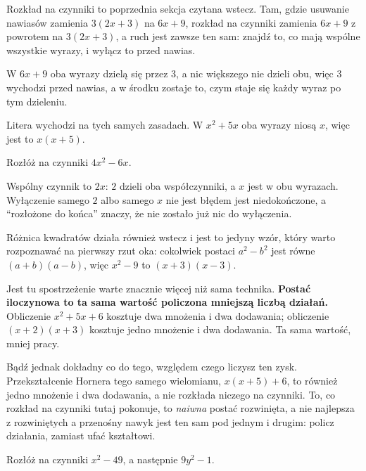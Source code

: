 \begin{fr}
Rozkład na czynniki to poprzednia sekcja czytana wstecz. Tam, gdzie usuwanie
nawiasów zamienia $3(2x + 3)$ na $6x + 9$, rozkład na czynniki zamienia
$6x + 9$ z powrotem na $3(2x + 3)$, a ruch jest zawsze ten sam: znajdź to, co
mają wspólne wszystkie wyrazy, i wyłącz to przed nawias.

W $6x + 9$ oba wyrazy dzielą się przez $3$, a nic większego nie dzieli obu,
więc $3$ wychodzi przed nawias, a w środku zostaje to, czym staje się każdy
wyraz po tym dzieleniu.

Litera wychodzi na tych samych zasadach. W $x^{2} + 5x$ oba wyrazy niosą $x$,
więc jest to $x(x + 5)$.

Rozłóż na czynniki $4x^{2} - 6x$.
\nextframe
\end{fr}

\begin{fr}
Wspólny czynnik to $2x$: $2$ dzieli oba współczynniki, a $x$ jest w obu
wyrazach. Wyłączenie samego $2$ albo samego $x$ nie jest błędem \dash{} jest
niedokończone, a \enquote{rozłożone do końca} znaczy, że nie zostało już nic do
wyłączenia.

Różnica kwadratów działa również wstecz i jest to jedyny wzór, który warto
rozpoznawać na pierwszy rzut oka: cokolwiek postaci $a^{2} - b^{2}$ jest równe
$(a+b)(a-b)$, więc $x^{2} - 9$ to $(x+3)(x-3)$.

Jest tu spostrzeżenie warte znacznie więcej niż sama technika. \textbf{Postać
iloczynowa to ta sama wartość policzona mniejszą liczbą działań.} Obliczenie
$x^{2} + 5x + 6$ kosztuje dwa mnożenia i dwa dodawania; obliczenie
$(x+2)(x+3)$ kosztuje jedno mnożenie i dwa dodawania. Ta sama wartość, mniej
pracy.

Bądź jednak dokładny co do tego, względem czego liczysz ten zysk.
Przekształcenie Hornera tego samego wielomianu, $x(x + 5) + 6$, to również
jedno mnożenie i dwa dodawania, a nie rozkłada niczego na czynniki. To, co
rozkład na czynniki tutaj pokonuje, to \emph{naiwna} postać rozwinięta, a nie
najlepsza z rozwiniętych \dash{} a przenośny nawyk jest ten sam pod jednym i
drugim: policz działania, zamiast ufać kształtowi.

Rozłóż na czynniki $x^{2} - 49$, a następnie $9y^{2} - 1$.
\dotline
\nextframe
\end{fr}


